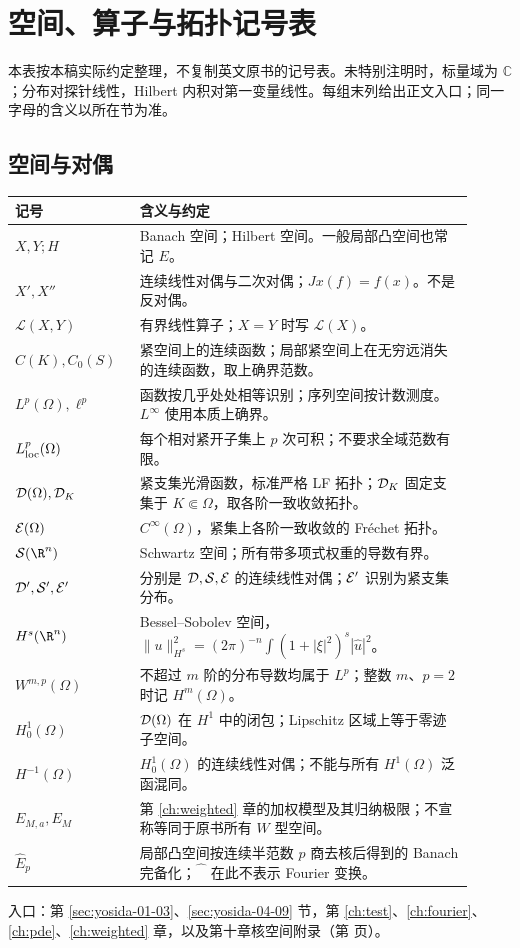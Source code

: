 \chapter{空间、算子与拓扑记号表}\label{back:notation}
本表按本稿实际约定整理，不复制英文原书的记号表。未特别注明时，标量域为 $\mathbb C$；分布对探针线性，Hilbert 内积对第一变量线性。每组末列给出正文入口；同一字母的含义以所在节为准。

\section*{空间与对偶}
\begin{longtable}{p{0.24\linewidth}p{0.67\linewidth}}
\toprule 记号 & 含义与约定\\\midrule\endhead
$X,Y;H$ & Banach 空间；Hilbert 空间。一般局部凸空间也常记 $E$。\\
$X',X''$ & 连续线性对偶与二次对偶；$Jx(f)=f(x)$。不是反对偶。\\
$\mathcal L(X,Y)$ & 有界线性算子；$X=Y$ 时写 $\mathcal L(X)$。\\
$C(K),C_0(S)$ & 紧空间上的连续函数；局部紧空间上在无穷远消失的连续函数，取上确界范数。\\
$L^p(\Omega),\ell^p$ & 函数按几乎处处相等识别；序列空间按计数测度。$L^\infty$ 使用本质上确界。\\
$L^p_{\mathrm{loc}}(\Omega)$ & 每个相对紧开子集上 $p$ 次可积；不要求全域范数有限。\\
$\mathcal{D}(\Omega),\mathcal{D}_K$ & 紧支集光滑函数，标准严格 LF 拓扑；$\mathcal{D}_K$ 固定支集于 $K\Subset\Omega$，取各阶一致收敛拓扑。\\
$\mathcal{E}(\Omega)$ & $C^\infty(\Omega)$，紧集上各阶一致收敛的 Fréchet 拓扑。\\
$\Sch(\R^n)$ & Schwartz 空间；所有带多项式权重的导数有界。\\
$\mathcal{D}',\mathcal{S}',\mathcal{E}'$ & 分别是 $\mathcal{D},\mathcal{S},\mathcal{E}$ 的连续线性对偶；$\mathcal{E}'$ 识别为紧支集分布。\\
$H^s(\R^n)$ & Bessel--Sobolev 空间，$\|u\|_{H^s}^2=(2\pi)^{-n}\int(1+|\xi|^2)^s|\widehat u|^2$。\\
$W^{m,p}(\Omega)$ & 不超过 $m$ 阶的分布导数均属于 $L^p$；整数 $m$、$p=2$ 时记 $H^m(\Omega)$。\\
$H_0^1(\Omega)$ & $\mathcal{D}(\Omega)$ 在 $H^1$ 中的闭包；Lipschitz 区域上等于零迹子空间。\\
$H^{-1}(\Omega)$ & $H_0^1(\Omega)$ 的连续线性对偶；不能与所有 $H^1(\Omega)$ 泛函混同。\\
$E_{M,a},E_M$ & 第 \ref{ch:weighted} 章的加权模型及其归纳极限；不宣称等同于原书所有 $W$ 型空间。\\
$\widehat E_p$ & 局部凸空间按连续半范数 $p$ 商去核后得到的 Banach 完备化；$\widehat{\phantom E}$ 在此不表示 Fourier 变换。\\
\bottomrule\end{longtable}
入口：第 \ref{sec:yosida-01-03}、\ref{sec:yosida-04-09} 节，第 \ref{ch:test}、\ref{ch:fourier}、\ref{ch:pde}、\ref{ch:weighted} 章，以及第十章核空间附录（第 \pageref{app:yosida-10} 页）。

